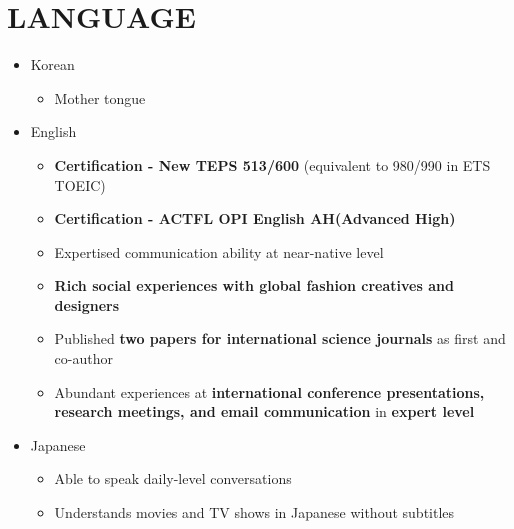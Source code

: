 \documentclass[a4paper,10pt]{extarticle}
\begin{document}

\section*{LANGUAGE}
\begin{itemize}
	\item Korean
	      \begin{itemize}
		      \item Mother tongue
	      \end{itemize}
	\item English
	      \begin{itemize}
		      \item \textbf{Certification - New TEPS 513/600} (equivalent to 980/990 in ETS TOEIC)
		      \item \textbf{Certification - ACTFL OPI English AH(Advanced High)}
		      \item Expertised communication ability at near-native level
		      \item \textbf{Rich social experiences with global fashion creatives and designers}
		      \item Published \textbf{two papers for international science journals} as first and co-author
		      \item Abundant experiences at \textbf{international conference presentations, research meetings, and email communication} in \textbf{expert level}
	      \end{itemize}
	\item Japanese
	      \begin{itemize}
		      \item Able to speak daily-level conversations
		      \item Understands movies and TV shows in Japanese without subtitles
	      \end{itemize}
\end{itemize}
\end{document}
